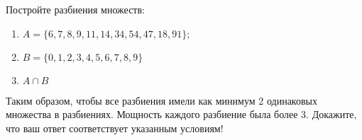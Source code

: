 \question
Постройте разбиения множеств:
\begin{enumerate}
	\renewcommand{\labelenumi}{\alph{enumi})}
	\item $A = \{6, 7, 8, 9, 11, 14, 34, 54, 47, 18, 91\};$
	\item $B = \{0, 1, 2, 3, 4, 5, 6, 7, 8, 9\}$
	\item $A \cap B$
\end{enumerate}
Таким образом, чтобы все разбиения имели как минимум 2 одинаковых множества в разбиениях.
Мощность каждого разбиение была более 3.
Докажите, что ваш ответ соответствует указанным условиям!